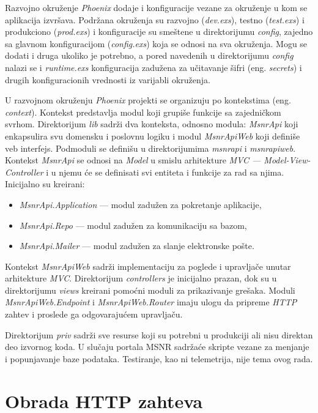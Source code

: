 \documentclass[12pt,oneside]{memoir}
\begin{document}
Razvojno okruženje \emph{Phoenix} dodaje i konfiguracije vezane za okruženje u kom se aplikacija izvršava. 
Podržana okruženja su razvojno (\emph{dev.exs}), testno (\emph{test.exs}) i produkciono (\emph{prod.exs}) i konfiguracije su smeštene u direktorijumu \emph{config},
zajedno sa glavnom konfiguracijom (\emph{config.exs}) koja se odnosi na sva okruženja. Mogu se dodati i druga ukoliko je potrebno, a pored navedenih
u direktorijumu \emph{config} nalazi se i \emph{runtime.exs} konfiguracija zadužena za učitavanje šifri (eng. \emph{secrets}) i drugih konfiguracionih vrednosti
iz varijabli okruženja.

U razvojnom okruženju \emph{Phoenix} projekti se organizuju po kontekstima (eng. \emph{context}). Kontekst predstavlja modul koji grupiše funkcije sa
zajedničkom svrhom. Direktorijum \emph{lib} sadrži dva konteksta, odnosno modula: \emph{MsnrApi} koji enkapsulira svu domensku i
poslovnu logiku i modul \emph{MsnrApiWeb} koji definiše veb interfejs. Podmoduli se definišu u direktorijumima \emph{msnr{\textunderscore}api}
i \emph{msnr{\textunderscore}api{\textunderscore}web}. 
Kontekst \emph{MsnrApi} se odnosi na \emph{Model} u smislu arhitekture \emph{MVC --- Model-View-Controller} i u njemu će se definisati svi entiteta i
funkcije za rad sa njima. Inicijalno su kreirani:
\begin{itemize}
  \item \emph{MsnrApi.Application} --- modul zadužen za pokretanje aplikacije,
  \item \emph{MsnrApi.Repo} --- modul zadužen za komunikaciju sa bazom,
  \item \emph{MsnrApi.Mailer} --- modul zadužen za slanje elektronske pošte.
\end{itemize}
Kontekst \emph{MsnrApiWeb} sadrži implementaciju za poglede i upravljače unutar arhitekture \emph{MVC}.
Direktorijum \emph{controllers} je inicijalno prazan, dok su u direktorijumu \emph{views} kreirani pomoćni moduli za prikazivanje grešaka.
Moduli \emph{MsnrApiWeb.Endpoint} i \emph{MsnrApiWeb.Router} imaju ulogu da pripreme \emph{HTTP} zahtev i proslede ga odgovarajućem
upravljaču.

Direktorijum \emph{priv} sadrži sve resurse koji su potrebni u produkciji ali nisu direktan deo izvornog koda. U slučaju portala MSNR
sadržaće skripte vezane za menjanje i popunjavanje baze podataka. Testiranje, kao ni telemetrija, nije tema ovog rada.

\section{Obrada HTTP zahteva}
\end{document}
